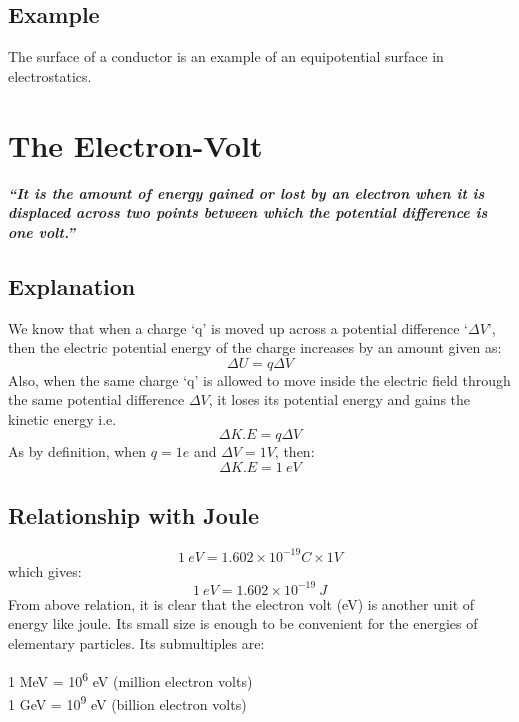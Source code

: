 \subsection*{Example}
The surface of a conductor is an example of
an equipotential surface in electrostatics.
\section{The Electron-Volt}
\textit{\textbf{“It is the amount of energy gained or lost by an electron when it is displaced
across two points between which the potential difference is one volt.”}}
\subsection*{Explanation}
We know that when a charge ‘q’ is moved up across a potential difference
‘$\Delta V$’, then the electric potential energy of the charge increases
by an amount given as:
\begin{equation}\nonumber
  \Delta U = q\Delta V
\end{equation}
Also, when the same charge ‘q’ is allowed to move inside the electric
field through the same potential difference $\Delta V$,
it loses its potential energy and gains the kinetic energy i.e.
\begin{equation}\nonumber
  \Delta K.E = q\Delta V
\end{equation}
As by definition, when $q = 1e$ and $\Delta V = 1 V$, then:
\begin{equation}\nonumber
  \Delta K.E = 1\:eV
\end{equation}
\subsection*{Relationship with Joule}
\begin{equation}\nonumber
  1\:eV = 1.602\times 10^{-19}C \times 1 V
\end{equation}
which gives:
\begin{equation}\nonumber
  1\:eV = 1.602\times 10^{-19}\:J
\end{equation}
From above relation, it is clear that the electron volt (eV) is another
unit of energy like joule. Its small size is enough to be convenient for the energies of elementary particles.
Its submultiples are:
\begin{center}
1 MeV = 10\textsuperscript{6} eV (million electron volts)\\
1 GeV = 10\textsuperscript{9} eV (billion electron volts)
\end{center}
